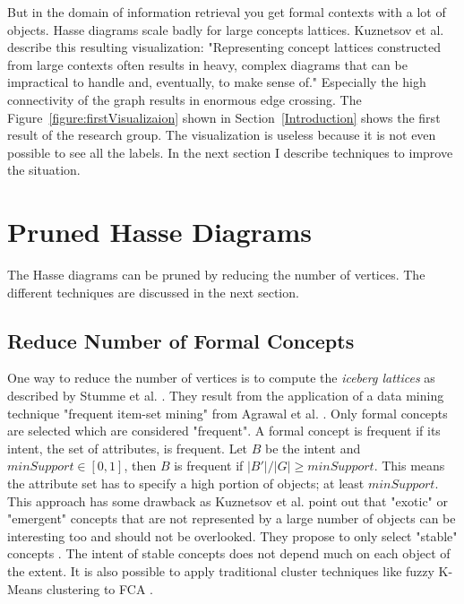 \documentclass[11pt]{report}
\begin{document}
But in the domain of information retrieval you get formal contexts with a lot of objects. Hasse diagrams scale badly for large concepts lattices. Kuznetsov et al. \cite{Kuznetsov20072}  describe this resulting visualization: "Representing concept lattices constructed from large contexts often results in heavy, complex diagrams that can be impractical to handle and, eventually, to make sense of." Especially the high connectivity of the graph results in enormous edge crossing. The Figure~\ref{figure:firstVisualizaion} shown in Section~\ref{Introduction} shows the first result of the research group. The visualization is useless because it is not even possible to see all the labels. In the next section I describe techniques to improve the situation.

\section{Pruned Hasse Diagrams}

The Hasse diagrams can be pruned by reducing the number of vertices. The different techniques are discussed in the next section.

\subsection{Reduce Number of Formal Concepts}

One way to reduce the number of vertices is to compute the \textit{iceberg lattices} as described by Stumme et al. \cite{Stumme2002}. They result from the application of a data mining technique "frequent item-set mining" from Agrawal et al. \cite{Agrawal1993}. Only formal concepts are selected which are considered "frequent". A formal concept is frequent if its intent, the set of attributes, is frequent. Let $B$ be the intent and $minSupport \in [0, 1]$, then $B$ is frequent if $ |B'|/|G| \geq minSupport$. This means the attribute set has to specify a high portion of objects; at least $minSupport$. This approach has some drawback as Kuznetsov et al. \cite{Kuznetsov20072} point out that "exotic" or "emergent" concepts that are not represented by a large number of objects can be interesting too and should not be overlooked. They propose to only select "stable" concepts \cite{Kuznetsov20072}. The intent of stable concepts does not depend much on each object of the extent. It is also possible to apply traditional cluster techniques like fuzzy K-Means clustering to FCA \cite{AswaniKumar2010}. \\
\end{document}

